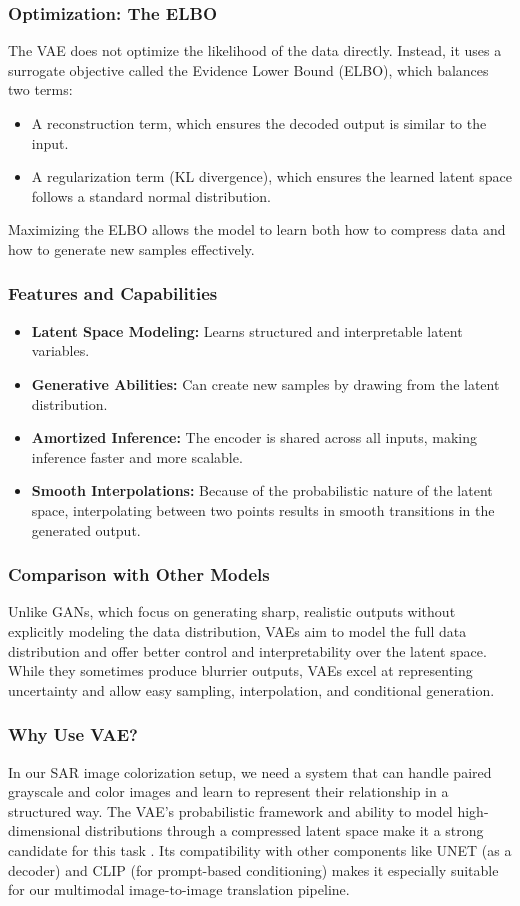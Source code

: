 \subsubsection{Optimization: The ELBO}
The VAE does not optimize the likelihood of the data directly. Instead, it uses a surrogate objective called the Evidence Lower Bound (ELBO), which balances two terms:
\begin{itemize}
    \item A reconstruction term, which ensures the decoded output is similar to the input.
    \item A regularization term (KL divergence), which ensures the learned latent space follows a standard normal distribution.
\end{itemize}
Maximizing the ELBO allows the model to learn both how to compress data and how to generate new samples effectively.

\subsubsection{Features and Capabilities}
\begin{itemize}
    \item \textbf{Latent Space Modeling:} Learns structured and interpretable latent variables.
    \item \textbf{Generative Abilities:} Can create new samples by drawing from the latent distribution.
    \item \textbf{Amortized Inference:} The encoder is shared across all inputs, making inference faster and more scalable.
    \item \textbf{Smooth Interpolations:} Because of the probabilistic nature of the latent space, interpolating between two points results in smooth transitions in the generated output.
\end{itemize}

\subsubsection{Comparison with Other Models}
Unlike GANs, which focus on generating sharp, realistic outputs without explicitly modeling the data distribution, VAEs aim to model the full data distribution and offer better control and interpretability over the latent space. While they sometimes produce blurrier outputs, VAEs excel at representing uncertainty and allow easy sampling, interpolation, and conditional generation.

\subsubsection{Why Use VAE?}
In our SAR image colorization setup, we need a system that can handle paired grayscale and color images and learn to represent their relationship in a structured way. The VAE’s probabilistic framework and ability to model high-dimensional distributions through a compressed latent space make it a strong candidate for this task \cite{Kingma_2019}. Its compatibility with other components like UNET (as a decoder) and CLIP (for prompt-based conditioning) makes it especially suitable for our multimodal image-to-image translation pipeline.



